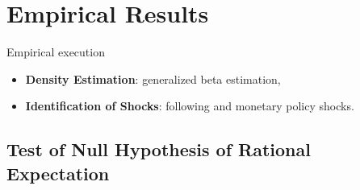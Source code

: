 \documentclass{beamer}
\begin{document}
\section{Empirical Results}

\begin{frame}{Empirical execution}

\begin{itemize}

\item \textbf{Density Estimation}: generalized beta estimation, \citet{engelberg2009comparing}
 \item \textbf{Identification of Shocks}: following \citet{coibion2012can} and monetary policy shocks. 
\end{itemize}

\end{frame}

\subsection{Test of Null Hypothesis of Rational Expectation}
\end{document}
